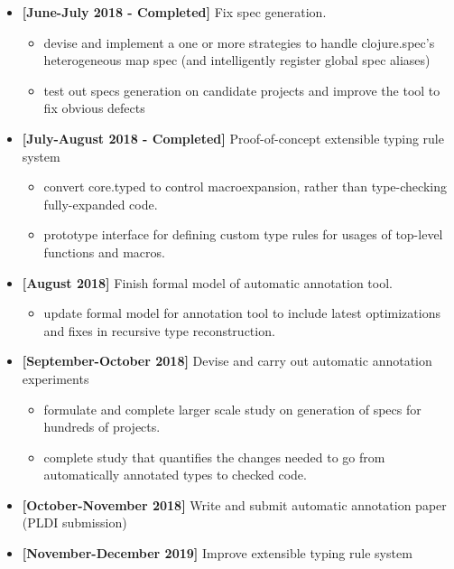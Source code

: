 \documentclass[9pt]{extarticle}
\begin{document}
\begin{itemize}
  \item \textbf{[June-July 2018 - Completed]} Fix spec generation.
    \begin{itemize}
      \item devise and implement a one or more strategies to handle clojure.spec's
        heterogeneous map spec (and intelligently register global spec aliases)
      \item test out specs generation on candidate projects and improve the tool to fix obvious
        defects
    \end{itemize}
  \item \textbf{[July-August 2018 - Completed]} Proof-of-concept extensible typing rule system
    \begin{itemize}
      \item convert core.typed to control macroexpansion, rather than type-checking
        fully-expanded code.
      \item prototype interface for defining custom type rules for usages of top-level functions and macros.
    \end{itemize}
  \item \textbf{[August 2018]} Finish formal model of automatic annotation tool.
    \begin{itemize}
      \item update formal model for annotation tool to include latest
        optimizations and fixes in recursive type reconstruction.
    \end{itemize}
  \item \textbf{[September-October 2018]} Devise and carry out automatic annotation experiments
    \begin{itemize}
      \item formulate and complete larger scale study on generation of specs for hundreds of projects.
      \item complete study that quantifies the changes needed to go from automatically annotated types
        to checked code.
    \end{itemize}
  \item \textbf{[October-November 2018]} Write and submit automatic annotation paper (PLDI submission)
  \item \textbf{[November-December 2019]} Improve extensible typing rule system

\end{itemize}
\end{document}
